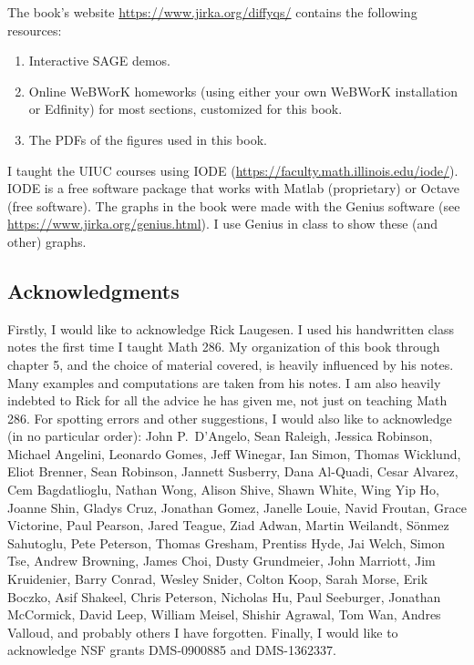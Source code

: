 \documentclass{ximera}
\begin{document}
The book's website \url{https://www.jirka.org/diffyqs/} contains the following resources:
\begin{enumerate}
    \item Interactive SAGE demos.
    \item Online WeBWorK homeworks (using either your own WeBWorK installation or Edfinity) for most sections, customized for this book.
    \item The PDFs of the figures used in this book.
\end{enumerate}

I taught the UIUC courses using IODE (\url{https://faculty.math.illinois.edu/iode/}). IODE is a free software package that works with Matlab (proprietary) or Octave (free software).
The graphs in the book were made with the Genius software (see \url{https://www.jirka.org/genius.html}).  I use Genius in class to show these (and other) graphs.

\subsection*{Acknowledgments}

Firstly, I would like to acknowledge Rick Laugesen.  I used his handwritten class notes the first time I taught Math 286.  My organization of this book through chapter 5, and the choice of material covered, is heavily influenced by his notes.  Many examples and computations are taken from his notes.  I am also heavily indebted to Rick for all the advice he has given me, not just on teaching Math 286. For spotting errors and other suggestions,
I would also like to acknowledge (in no particular order):
John P.\ D'Angelo, Sean Raleigh, Jessica Robinson, Michael Angelini, Leonardo Gomes, Jeff
Winegar, Ian Simon, Thomas Wicklund, Eliot Brenner, Sean Robinson,
Jannett Susberry, Dana Al-Quadi, Cesar Alvarez, Cem Bagdatlioglu,
Nathan Wong, Alison Shive, Shawn White, Wing Yip Ho, Joanne Shin,
Gladys Cruz, Jonathan Gomez, Janelle Louie, Navid Froutan,
Grace Victorine, Paul Pearson, Jared Teague, Ziad Adwan,
Martin Weilandt, S\"{o}nmez Sahutoglu,%
Pete Peterson, Thomas Gresham, Prentiss Hyde, Jai Welch,
Simon Tse, Andrew Browning, James Choi, Dusty Grundmeier,
John Marriott,
Jim Kruidenier,
Barry Conrad,
Wesley Snider,
Colton Koop,
Sarah Morse,
Erik Boczko,
Asif Shakeel,
Chris Peterson,
Nicholas Hu,
Paul Seeburger,
Jonathan McCormick,
David Leep,
William Meisel,
Shishir Agrawal,
Tom Wan,
Andres Valloud,
and probably others I
have forgotten.
Finally, I would like to acknowledge NSF grants DMS-0900885 and DMS-1362337.
\end{document}

